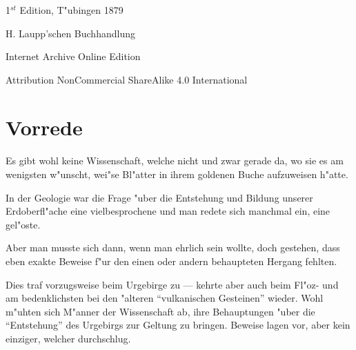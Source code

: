 \documentclass[a4paper, 11pt, oneside, german]{article}
\begin{document}
\begin{titlepage}

	
		
	\vspace*{\fill}%
	
	1$^{st}$ Edition, T"ubingen 1879 %
	
	{\small H. Laupp'schen Buchhandlung } %

	\vspace{1\baselineskip} %

    Internet Archive Online Edition  %
	
	{\small Attribution NonCommercial ShareAlike 4.0 International } %
\end{titlepage}
\setlength{\parskip}{1mm plus1mm minus1mm}
\setcounter{tocdepth}{2}
\setcounter{secnumdepth}{3}
\tableofcontents
\clearpage
\listoffigures
\clearpage
\section*{Vorrede}
\paragraph{}
Es gibt wohl keine Wissenschaft, welche nicht und zwar gerade da, wo sie es am wenigsten w"unscht, wei"se Bl"atter in ihrem goldenen Buche aufzuweisen h"atte.

In der Geologie war die Frage "uber die Entstehung und Bildung unserer Erdoberfl"ache eine vielbesprochene und man redete sich manchmal ein, eine gel"oste.

Aber man musste sich dann, wenn man ehrlich sein wollte, doch gestehen, dass eben exakte Beweise f"ur den einen oder andern behaupteten Hergang fehlten.

Dies traf vorzugsweise beim Urgebirge zu --- kehrte aber auch beim Fl"oz- und am bedenklichsten bei den "alteren "`vulkanischen Gesteinen"' wieder. Wohl m"uhten sich M"anner der Wissenschaft ab, ihre Behauptungen "uber die "`Entstehung"' des Urgebirgs zur Geltung zu bringen. Beweise lagen vor, aber kein einziger, welcher durchschlug.
\end{document}
